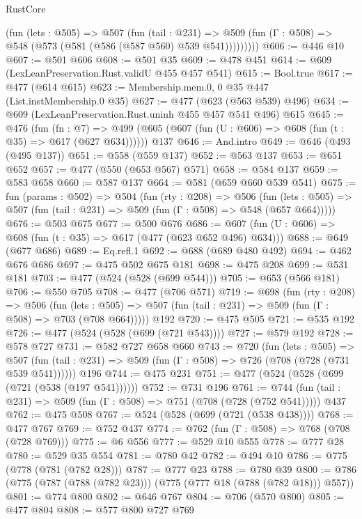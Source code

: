 \begin{lexlean}{RustCore}
\begin{coremodule}
{\begin{coremodule}
{{{{{          (fun (lets : @505) =>
          @507
            (fun (tail : @231) =>
            @509 (fun (Γ : @508) => @548 (@573 (@581 (@586 (@587 @560) @539 @541)))))))))
@606 := @446 @10
@607 := @501 @606
@608 := @501 @35
@609 := @478 @451
@614 := @609 (LexLeanPreservation.Rust.validU @455 @457 @541)
@615 := Bool.true
@617 := @477 (@614 @615)
@623 := Membership.mem.{0, 0} @35 @447 (List.instMembership.{0} @35)
@627 := @477 (@623 (@563 @539) @496)
@634 := @609 (LexLeanPreservation.Rust.uninh @455 @457 @541 @496) @615
@645 := @476
    (fun (fn : @7) =>
    @499 (@605 (@607 (fun (U : @606) => @608 (fun (t : @35) => @617 (@627 @634))))))
    @137
@646 := And.intro
@649 := @646 (@493 (@495 @137))
@651 := @558 (@559 @137)
@652 := @563 @137
@653 := @651 @652
@657 := @477 (@550 (@653 @567) @571)
@658 := @584 @137
@659 := @583 @658
@660 := @587 @137
@664 := @581 (@659 @660 @539 @541)
@675 := fun (params : @502) =>
  @504
    (fun (rty : @208) =>
    @506
      (fun (lets : @505) => @507 (fun (tail : @231) => @509 (fun (Γ : @508) => @548 (@657 @664)))))
@676 := @503 @675
@677 := @500 @676
@686 := @607 (fun (U : @606) => @608 (fun (t : @35) => @617 (@477 (@623 @652 @496) @634)))
@688 := @649 (@677 @686)
@689 := Eq.refl.{1}
@692 := @688 (@689 @480 @492)
@694 := @462 @676 @686
@697 := @475 @502 @675 @181
@698 := @475 @208
@699 := @531 @181
@703 := @477 (@524 (@528 (@699 @544)))
@705 := @653 (@566 @181)
@706 := @550 @705
@708 := @477 (@706 @571)
@719 := @698
    (fun (rty : @208) =>
    @506
      (fun (lets : @505) => @507 (fun (tail : @231) => @509 (fun (Γ : @508) => @703 (@708 @664)))))
    @192
@720 := @475 @505
@721 := @535 @192
@726 := @477 (@524 (@528 (@699 (@721 @543))))
@727 := @579 @192
@728 := @578 @727
@731 := @582 @727 @658 @660
@743 := @720
    (fun (lets : @505) =>
    @507 (fun (tail : @231) => @509 (fun (Γ : @508) => @726 (@708 (@728 (@731 @539 @541))))))
    @196
@744 := @475 @231
@751 := @477 (@524 (@528 (@699 (@721 (@538 (@197 @541))))))
@752 := @731 @196
@761 := @744 (fun (tail : @231) => @509 (fun (Γ : @508) => @751 (@708 (@728 (@752 @541))))) @437
@762 := @475 @508
@767 := @524 (@528 (@699 (@721 (@538 @438))))
@768 := @477 @767
@769 := @752 @437
@774 := @762 (fun (Γ : @508) => @768 (@708 (@728 @769)))
@775 := @6 @556
@777 := @529 @10 @555
@778 := @777 @28
@780 := @529 @35 @554
@781 := @780 @42
@782 := @494 @10
@786 := @775 (@778 (@781 (@782 @28)))
@787 := @777 @23
@788 := @780 @39
@800 := @786 (@775 (@787 (@788 (@782 @23))) (@775 (@777 @18 (@788 (@782 @18))) @557))
@801 := @774 @800
@802 := @646 @767
@804 := @706 (@570 @800)
@805 := @477 @804
@808 := @577 @800 @727 @769
}}}}}
\end{coremodule}}
\end{coremodule}
\end{lexlean}
